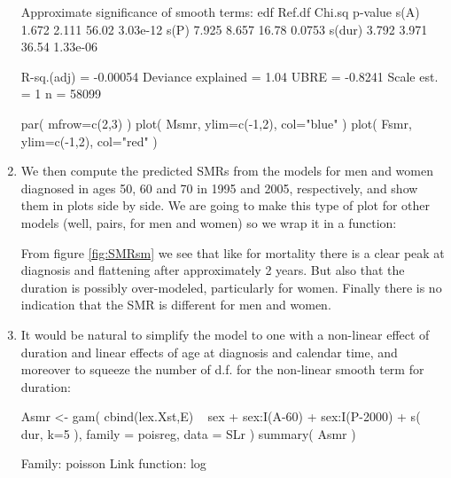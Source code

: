 \begin{enumerate}[resume]
\begin{Schunk}
\begin{Soutput}
Approximate significance of smooth terms:
         edf Ref.df Chi.sq  p-value
s(A)   1.672  2.111  56.02 3.03e-12
s(P)   7.925  8.657  16.78   0.0753
s(dur) 3.792  3.971  36.54 1.33e-06

R-sq.(adj) =  -0.00054   Deviance explained = 1.04%
UBRE = -0.8241  Scale est. = 1         n = 58099
\end{Soutput}
\begin{Sinput}
 par( mfrow=c(2,3) )
 plot( Msmr, ylim=c(-1,2), col="blue" )
 plot( Fsmr, ylim=c(-1,2), col="red" )
\end{Sinput}
\end{Schunk}


\item We then compute the predicted SMRs from the models for men and
  women diagnosed in ages 50, 60 and 70 in 1995 and 2005,
  respectively, and show them in plots side by side. We are going to
  make this type of plot for other models (well, pairs, for men and
  women) so we wrap it in a function:
\begin{Schunk}
\end{Schunk}

From figure \ref{fig:SMRsm} we see that like for mortality there is a
clear peak at diagnosis and flattening after approximately 2
years. But also that the duration is possibly over-modeled,
particularly for women. Finally there is no indication that the SMR is
different for men and women.
  
  
\item It would be natural to simplify the model to one with a non-linear
  effect of duration and linear effects of age at diagnosis and
  calendar time, and moreover to squeeze the number of d.f. for the
  non-linear smooth term for duration:
\begin{Schunk}
\begin{Sinput}
 Asmr <- gam( cbind(lex.Xst,E) ~ sex +
                                 sex:I(A-60) + 
                                 sex:I(P-2000) +
                                 s( dur, k=5 ),
              family = poisreg,
                data = SLr )
 summary( Asmr )
\end{Sinput}
\begin{Soutput}
Family: poisson 
Link function: log 


\end{Soutput}
\end{Schunk}
\end{enumerate}
